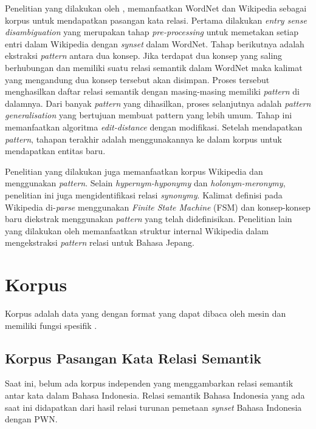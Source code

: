 Penelitian yang dilakukan oleh \cite{ruiz2005automatic}, memanfaatkan WordNet dan Wikipedia sebagai korpus untuk mendapatkan pasangan kata relasi. Pertama dilakukan \textit{entry sense disambiguation} yang merupakan tahap \textit{pre-processing} untuk memetakan setiap entri dalam Wikipedia dengan \textit{synset} dalam WordNet. Tahap berikutnya adalah ekstraksi \textit{pattern} antara dua konsep. Jika terdapat dua konsep yang saling berhubungan dan memiliki suatu relasi semantik dalam WordNet maka kalimat yang mengandung dua konsep tersebut akan disimpan. Proses tersebut menghasilkan daftar relasi semantik dengan masing-masing memiliki \textit{pattern} di dalamnya. Dari banyak \textit{pattern} yang dihasilkan, proses selanjutnya adalah \textit{pattern generalisation} yang bertujuan membuat pattern yang lebih umum. Tahap ini memanfaatkan algoritma \textit{edit-distance} dengan modifikasi. Setelah mendapatkan \textit{pattern}, tahapan terakhir adalah menggunakannya ke dalam korpus untuk mendapatkan entitas baru.

Penelitian yang dilakukan \cite{arnold2014extracting} juga memanfaatkan korpus Wikipedia dan menggunakan \textit{pattern}. Selain \textit{hypernym-hyponymy} dan \textit{holonym-meronymy}, penelitian ini juga mengidentifikasi relasi \textit{synonymy}. Kalimat definisi pada Wikipedia di-\textit{parse} menggunakan \textit{Finite State Machine} (FSM) dan konsep-konsep baru diekstrak menggunakan \textit{pattern} yang telah didefinisikan. Penelitian lain yang dilakukan oleh \cite{sumida2008hacking} memanfaatkan struktur internal Wikipedia dalam mengekstraksi \textit{pattern} relasi untuk Bahasa Jepang. 


\section{Korpus}
Korpus adalah data yang dengan format yang dapat dibaca oleh mesin dan memiliki fungsi spesifik \citep{atkins1992corpus}.

\subsection{Korpus Pasangan Kata Relasi Semantik}
Saat ini, belum ada korpus independen yang menggambarkan relasi semantik antar kata dalam Bahasa Indonesia. Relasi semantik Bahasa Indonesia yang ada saat ini didapatkan dari hasil relasi turunan pemetaan \textit{synset} Bahasa Indonesia dengan PWN. 

